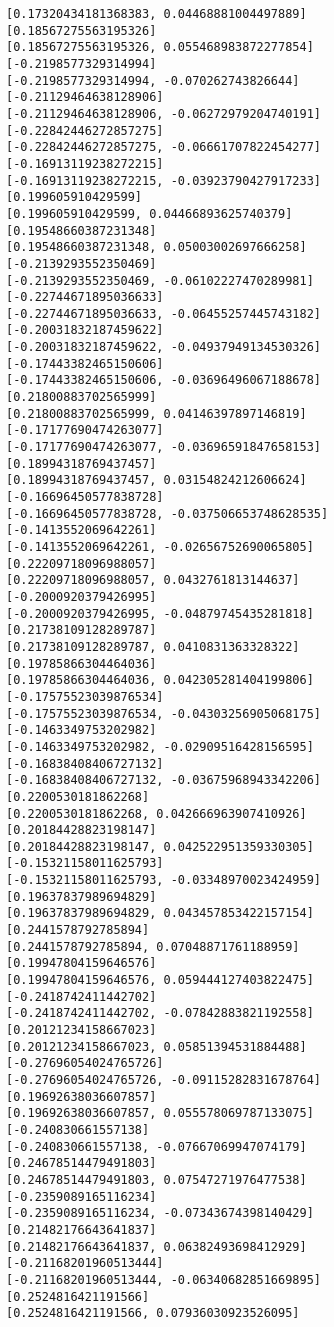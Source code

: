 \documentclass[11pt]{article}
\begin{document}
\begin{Verbatim}[commandchars=\\\{\}]
[0.17320434181368383, 0.04468881004497889]
[0.18567275563195326]
[0.18567275563195326, 0.055468983872277854]
[-0.2198577329314994]
[-0.2198577329314994, -0.070262743826644]
[-0.21129464638128906]
[-0.21129464638128906, -0.06272979204740191]
[-0.22842446272857275]
[-0.22842446272857275, -0.06661707822454277]
[-0.16913119238272215]
[-0.16913119238272215, -0.03923790427917233]
[0.199605910429599]
[0.199605910429599, 0.04466893625740379]
[0.19548660387231348]
[0.19548660387231348, 0.05003002697666258]
[-0.2139293552350469]
[-0.2139293552350469, -0.06102227470289981]
[-0.22744671895036633]
[-0.22744671895036633, -0.06455257445743182]
[-0.20031832187459622]
[-0.20031832187459622, -0.04937949134530326]
[-0.17443382465150606]
[-0.17443382465150606, -0.03696496067188678]
[0.21800883702565999]
[0.21800883702565999, 0.04146397897146819]
[-0.17177690474263077]
[-0.17177690474263077, -0.03696591847658153]
[0.18994318769437457]
[0.18994318769437457, 0.03154824212606624]
[-0.16696450577838728]
[-0.16696450577838728, -0.037506653748628535]
[-0.1413552069642261]
[-0.1413552069642261, -0.02656752690065805]
[0.22209718096988057]
[0.22209718096988057, 0.0432761813144637]
[-0.2000920379426995]
[-0.2000920379426995, -0.04879745435281818]
[0.21738109128289787]
[0.21738109128289787, 0.0410831363328322]
[0.19785866304464036]
[0.19785866304464036, 0.042305281404199806]
[-0.17575523039876534]
[-0.17575523039876534, -0.04303256905068175]
[-0.1463349753202982]
[-0.1463349753202982, -0.02909516428156595]
[-0.16838408406727132]
[-0.16838408406727132, -0.03675968943342206]
[0.2200530181862268]
[0.2200530181862268, 0.042666963907410926]
[0.20184428823198147]
[0.20184428823198147, 0.042522951359330305]
[-0.15321158011625793]
[-0.15321158011625793, -0.03348970023424959]
[0.19637837989694829]
[0.19637837989694829, 0.043457853422157154]
[0.2441578792785894]
[0.2441578792785894, 0.07048871761188959]
[0.19947804159646576]
[0.19947804159646576, 0.059444127403822475]
[-0.2418742411442702]
[-0.2418742411442702, -0.07842883821192558]
[0.20121234158667023]
[0.20121234158667023, 0.05851394531884488]
[-0.27696054024765726]
[-0.27696054024765726, -0.09115282831678764]
[0.19692638036607857]
[0.19692638036607857, 0.055578069787133075]
[-0.240830661557138]
[-0.240830661557138, -0.07667069947074179]
[0.24678514479491803]
[0.24678514479491803, 0.07547271976477538]
[-0.2359089165116234]
[-0.2359089165116234, -0.07343674398140429]
[0.21482176643641837]
[0.21482176643641837, 0.06382493698412929]
[-0.21168201960513444]
[-0.21168201960513444, -0.06340682851669895]
[0.2524816421191566]
[0.2524816421191566, 0.07936030923526095]

\end{Verbatim}
\end{document}
